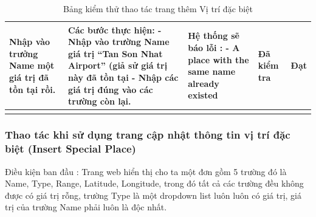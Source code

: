 \documentclass[a4paper]{article}
\begin{document}
\begin{longtable}{ | p{} |p{} | p{}  | p{}  | p{}  | }
\hline
Nhập vào trưởng Name một giá trị đã tồn tại rồi. &
Các bước thực hiện: \newline
- Nhập vào trường Name giá trị “Tan Son Nhat Airport” (giả sử giá trị này đã tồn tại
  \newline
- Nhập các giá trị đúng vào các trường còn lại. \newline 
&
Hệ thống sẽ báo lỗi : \newline
- A place with the same name already existed
&
Đã kiểm tra &
Đạt \\

\hline
\caption{Bảng kiểm thử thao tác trang thêm Vị trí đặc biệt}
\end{longtable} 

\subsubsection*{Thao tác khi sử dụng trang cập nhật thông tin vị trí đặc biệt (Insert Special Place)  }
Điều kiện ban đầu : Trang web hiển thị cho ta một đơn gồm 5 trường đó là Name, Type, Range, Latitude, Longitude, trong đó tất cả các trường đều không được có giá trị rỗng, trường Type là một dropdown list luôn luôn có giá trị, giá trị của trường Name phải luôn là độc nhất.  \newline
\end{document}
